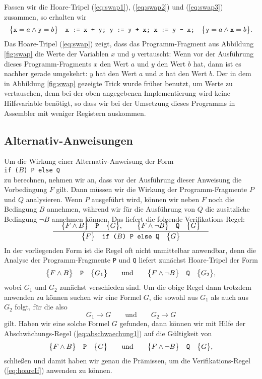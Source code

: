 Fassen wir die Hoare-Tripel (\ref{eq:swap1}), (\ref{eq:swap2}) und (\ref{eq:swap3})
zusammen, so erhalten wir
\begin{equation}
  \label{eq:swap}
  \bigl\{\texttt{x} = a \wedge \texttt{y} = b\bigr\}\quad\texttt{x := x + y; y := y + x; x := y - x;}\quad\bigl\{ 
         \texttt{y} = a \wedge \texttt{x} = b\bigr\}.   
\end{equation}
Das Hoare-Tripel (\ref{eq:swap}) zeigt, dass das Programm-Fragment aus Abbildung
\ref{fig:swap} die Werte der Variablen $x$ und $y$ vertauscht: Wenn vor der Ausf\"uhrung
dieses Programm-Fragments $x$ den Wert $a$ und $y$ den Wert $b$ hat, dann ist es nachher
gerade umgekehrt: $y$ hat den Wert $a$ und $x$ hat den Wert $b$.  Der in dem in Abbildung
\ref{fig:swap} gezeigte Trick wurde fr\"uher 
benutzt, um  Werte zu vertauschen, denn bei der oben angegebenen
Implementierung wird keine Hilfsvariable ben\"otigt, so dass wir bei der Umsetzung dieses
Programms in Assembler mit weniger Registern auskommen.

\subsection{Alternativ-Anweisungen}
Um die Wirkung einer Alternativ-Anweisung der Form 
\\[0.2cm]
\hspace*{1.3cm}
\texttt{if ($B$)  P  else  Q }
\\[0.2cm]
zu berechnen, nehmen wir an, dass vor der Ausf\"uhrung dieser Anweisung die Vorbedingung
$F$ gilt.  Dann m\"ussen wir die Wirkung der Programm-Fragmente $P$ und $Q$ analysieren.
Wenn $P$ ausgef\"uhrt wird, k\"onnen wir neben $F$ noch die Bedingung $B$ annehmen, w\"ahrend
wir f\"ur die Ausf\"uhrung von $Q$ die zus\"atzliche Bedingung $\neg B$ annehmen k\"onnen.
Das liefert die folgende Verifikations-Regel:
\begin{equation}
  \label{eq:hoareIf}
  \bruch{\quad\hoare{F \wedge B}{P}{G}, \qquad \hoare{F \wedge \neg B}{Q}{G}\quad}{
              \hoare{F}{if ($B$) P else Q}{G}}  
\end{equation}
In der vorliegenden Form ist die Regel oft nicht unmittelbar anwendbar, denn die Analyse
der Programm-Fragmente \texttt{P} und \texttt{Q} liefert zun\"achst Hoare-Tripel der Form
\begin{equation}
  \label{eq:abschwaechung1}
 \bigl\{F \wedge B\bigr\}\quad\texttt{P}\quad\bigl\{G_1\bigr\} \qquad \mathrm{und} \qquad \bigl\{F \wedge \neg B\bigr\}\quad\texttt{Q}\quad\bigl\{G_2\bigr\},   
\end{equation}
wobei $G_1$ und $G_2$ zun\"achst verschieden sind.   Um die obige Regel dann trotzdem
anwenden zu k\"onnen suchen wir eine Formel $G$, die sowohl aus $G_1$ als auch aus $G_2$
folgt, f\"ur die also
\[ G_1 \rightarrow G \qquad \mathrm{und} \qquad G_2 \rightarrow G \]
gilt.  Haben wir eine solche Formel $G$ gefunden, dann k\"onnen wir mit Hilfe der
Abschw\"achungs-Regel (\ref{eq:abschwaechung1})
auf die G\"ultigkeit von
\[ \bigl\{F \wedge B\bigr\}\quad\texttt{P}\quad\bigl\{G\bigr\} \qquad \mathrm{und} \qquad \bigl\{F \wedge \neg B\bigr\}\quad\texttt{Q}\quad\bigl\{G\bigr\},    \] 
schlie{\ss}en und damit haben wir genau die Pr\"amissen, um die 
Verifikations-Regel (\ref{eq:hoareIf}) anwenden zu k\"onnen.
\vspace*{0.3cm}

